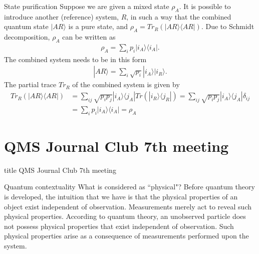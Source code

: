 \documentclass{beamer}
\begin{document}
\begin{frame}{State purification}
\justify
Suppose we are given a mixed state $\rho_A$. It is possible to introduce another (reference) system, $R$, in such a way that the combined quantum state $|AR\rangle$ is a pure state, and $\rho_A = Tr_R(|AR\rangle \langle AR|)$.
\vfill
Due to Schmidt decomposition, $\rho_A$ can be written as
\begin{align}
\rho_A = \sum_i p_i |i_A \rangle \langle i_A|.
\end{align}
\vfill
The combined system needs to be in this form
\begin{align}
|AR\rangle = \sum_i \sqrt{p_i} |i_A\rangle |i_R\rangle.
\end{align}
\vfill
The partial trace $Tr_R$ of the combined system is given by
\begin{align}
Tr_R(|AR\rangle \langle AR|) & = \sum_{ij} \sqrt{p_i p_j} |i_A\rangle \langle j_A| Tr(|i_R\rangle \langle j_R|) = \sum_{ij} \sqrt{p_i p_j} |i_A\rangle \langle j_A| \delta_{ij} \nonumber \\
& = \sum_i p_i |i_A\rangle \langle i_A| = \rho_A
\end{align}
\end{frame}

\section{QMS Journal Club 7th meeting}
\begin{frame}
\vfill
\centering
\begin{beamercolorbox}[sep=8pt,center,shadow=true,rounded=true]{title}
\Large QMS Journal Club 7th meeting
\end{beamercolorbox}
\vfill
\end{frame}

\begin{frame}{Quantum contextuality}
\justify
What is considered as ``physical"?
\vfill
Before quantum theory is developed, the intuition that we have is that the physical properties of an object exist independent of observation.
\vfill
Measurements merely act to reveal such physical properties.
\vfill
According to quantum theory, an unobserved particle does not possess physical properties that exist independent of observation.
\vfill
Such physical properties arise as a consequence of measurements performed upon the system.
\end{frame}
\end{document}
